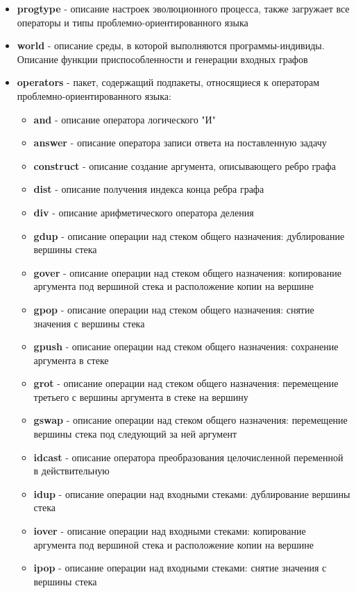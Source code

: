 \documentclass[russian,utf8,emptystyle]{eskdtext}
\begin{document}
\begin{spacing}{1.5}
\begin{itemize}
\begin{itemize}
\item \textbf{progtype} - описание настроек эволюционного процесса, также загружает все операторы и типы проблемно-ориентированного языка
\item \textbf{world} - описание среды, в которой выполняются программы-индивиды. Описание функции приспособленности и генерации входных графов
\item \textbf{operators} - пакет, содержащий подпакеты, относящиеся к операторам проблемно-ориентированного языка:
\begin{itemize}
\item \textbf{and} - описание оператора логического "И"
\item \textbf{answer} - описание оператора записи ответа на поставленную задачу
\item \textbf{construct} - описание создание аргумента, описывающего ребро графа
\item \textbf{dist} - описание получения индекса конца ребра графа
\item \textbf{div} - описание арифметического оператора деления
\item \textbf{gdup} - описание операции над стеком общего назначения: дублирование вершины стека
\item \textbf{gover} - описание операции над стеком общего назначения: копирование аргумента под вершиной стека и расположение копии на вершине
\item \textbf{gpop} - описание операции над стеком общего назначения: снятие значения с вершины стека
\item \textbf{gpush} - описание операции над стеком общего назначения: сохранение аргумента в стеке
\item \textbf{grot} -  описание операции над стеком общего назначения: перемещение третьего с вершины аргумента в стеке на вершину
\item \textbf{gswap} - описание операции над стеком общего назначения: перемещение вершины стека под следующий за ней аргумент
\item \textbf{idcast} -  описание оператора преобразования целочисленной переменной в действительную
\item \textbf{idup} - описание операции над входными стеками: дублирование вершины стека
\item \textbf{iover} - описание операции над входными стеками: копирование аргумента под вершиной стека и расположение копии на вершине
\item \textbf{ipop} - описание операции над входными стеками: снятие значения с вершины стека

\end{itemize}
\end{itemize}
\end{itemize}
\end{spacing}
\end{document}
